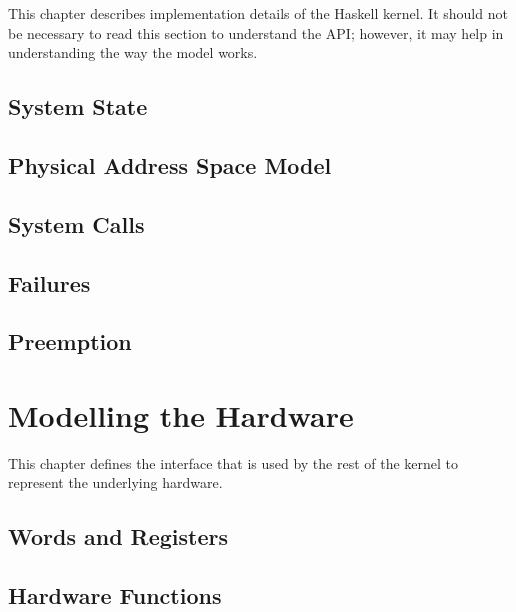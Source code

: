 \documentclass{ertos-book}
\begin{document}
This chapter describes implementation details of the Haskell kernel. It should not be necessary to read this section to understand the API; however, it may help in understanding the way the model works.

\section[statedata]{System State}


\section[pspace]{Physical Address Space Model}


\section[syscall]{System Calls}


\section[failures]{Failures}


\section[preemption]{Preemption}


\chapter[machine]{Modelling the Hardware}\label{ch:code:machine}

This chapter defines the interface that is used by the rest of the kernel to represent the underlying hardware.

\section[registerset]{Words and Registers}


\section[hardware]{Hardware Functions}

\end{document}
